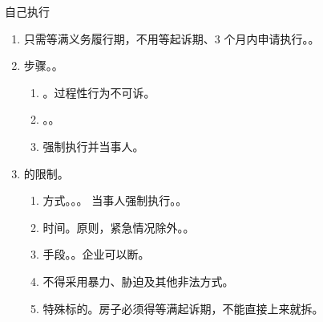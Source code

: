 \begin{enumerate}
\begin{enumerate}
                \begin{kk}{自己执行}
                  \begin{enumerate}
                    \item 只需等满义务履行期，不用等起诉期、3 个月内申请执行。。
                    \item 步骤。。
                          \begin{enumerate}
                            \item {}。过程性行为不可诉。
                            \item {}。。
                            \item {}强制执行并当事人。
                          \end{enumerate}
                    \item {}的限制。
                          \begin{enumerate}
                            \item 方式。。。
                                  当事人强制执行。。
                            \item 时间。原则，紧急情况除外。。
                            \item 手段。。企业可以断。
                            \item 不得采用暴力、胁迫及其他非法方式。
                            \item 特殊标的。房子必须得等满起诉期，不能直接上来就拆。
                          \end{enumerate}
                  \end{enumerate}
                \end{kk}


\end{enumerate}
\end{enumerate}
